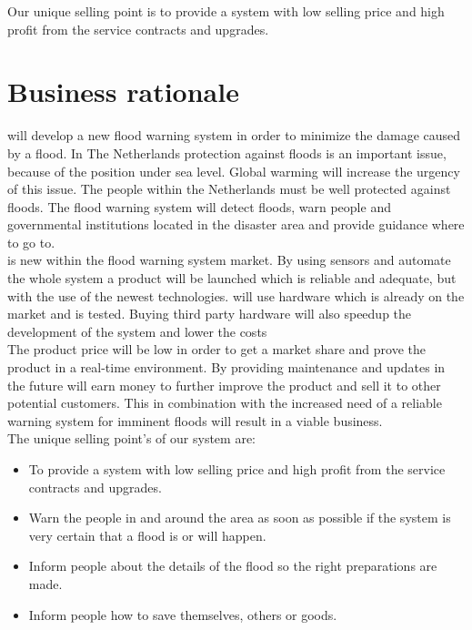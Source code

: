 

Our unique selling point is to provide a system with low selling price and high profit from the service contracts and upgrades.

\section{Business rationale}
\CompanyName will develop a new flood warning system in order to minimize the damage caused by a flood. In The Netherlands protection against floods is an important issue, because of the position under sea level. Global warming will increase the urgency of this issue. The people within the Netherlands must be well protected against floods. The flood warning system will detect floods, warn people and governmental institutions located in the disaster area and provide guidance where to go to. 
\\
\CompanyName is new within the flood warning system market. By using sensors and automate the whole system a product will be launched which is reliable and adequate, but with the use of the newest technologies. \CompanyName will use hardware which is already on the market and is tested. Buying third party hardware will also speedup the development of the system and lower the costs\\

The product price will be low in order to get a market share and prove the product in a real-time environment. By providing maintenance and updates in the future \CompanyName will earn money to further improve the product and sell it to other potential customers. This in combination with the increased need of a reliable warning system for imminent floods will result in a viable business.\\


The unique selling point's of our system are: 
\begin{itemize}
	\item To provide a system with low selling price and high profit from the service contracts and upgrades.
	\item Warn the people in and around the area as soon as possible if the system is very certain that a flood is or will happen.
	\item Inform people about the details of the flood so the right preparations are made. 
	\item Inform people how to save themselves, others or goods.
\end{itemize}

